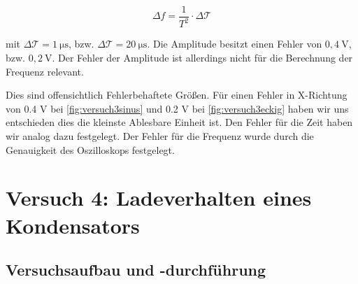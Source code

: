         \begin{equation}
            \Delta f = \frac{1}{T^2} \cdot \Delta \mathcal{T}
            \label{eq:größtfehler}
        \end{equation}

        mit $\Delta \mathcal{T} = 1\ \mathrm{\mu s}$, bzw. $\Delta \mathcal{T} = 20\ \mathrm{\mu s}$. Die Amplitude besitzt einen Fehler von $0,4\ \mathrm{V}$, bzw. $0,2\ \mathrm{V}$. Der Fehler der Amplitude ist allerdings nicht für die Berechnung der Frequenz relevant.

        Dies sind offensichtlich Fehlerbehaftete Größen. Für einen Fehler in X-Richtung von 0.4 V bei \ref{fig:versuch3sinus} und 0.2 V bei \ref{fig:versuch3eckig} haben wir uns entschieden dies die kleinste Ablesbare Einheit ist. Den Fehler für die Zeit haben wir analog dazu festgelegt. Der Fehler für die Frequenz wurde durch die Genauigkeit des Oszilloskops festgelegt.

\section{Versuch 4: Ladeverhalten eines Kondensators}

    \subsection{Versuchsaufbau und -durchführung}

